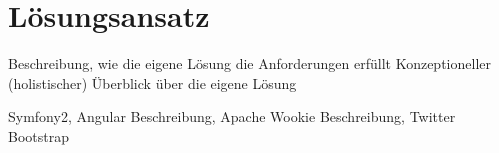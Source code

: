 \chapter{Lösungsansatz} 
\label{Kapitel 5}
Beschreibung, wie die eigene Lösung die Anforderungen erfüllt
Konzeptioneller (holistischer) Überblick über die eigene Lösung

Symfony2, Angular Beschreibung, Apache Wookie Beschreibung, Twitter Bootstrap
